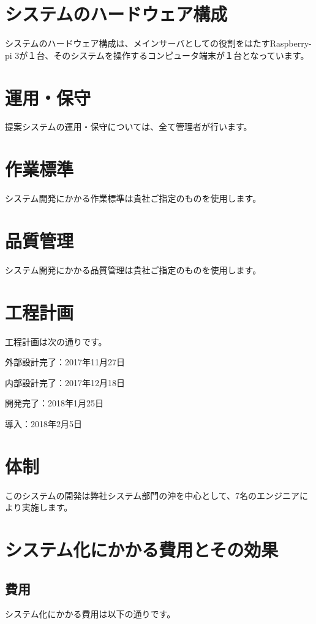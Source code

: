 \documentclass[a4j,titlepage]{ujarticle}
\begin{document}
\section{システムのハードウェア構成}
システムのハードウェア構成は、メインサーバとしての役割をはたすRaspberry-pi 3が１台、そのシステムを操作するコンピュータ端末が１台となっています。 %

\section{運用・保守}
提案システムの運用・保守については、全て管理者が行います。 %

\section{作業標準}
システム開発にかかる作業標準は貴社ご指定のものを使用します。

\section{品質管理}
システム開発にかかる品質管理は貴社ご指定のものを使用します。

\section{工程計画}
工程計画は次の通りです。

外部設計完了：2017年11月27日

内部設計完了：2017年12月18日

開発完了：2018年1月25日

導入：2018年2月5日

\section{体制}
このシステムの開発は弊社システム部門の沖を中心として、7名のエンジニアにより実施します。

\section{システム化にかかる費用とその効果}
\subsection{費用}
システム化にかかる費用は以下の通りです。
\end{document}
